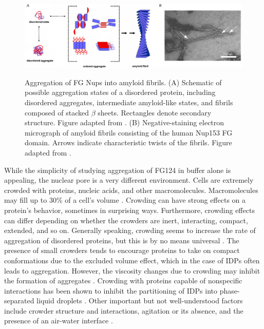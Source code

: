 \begin{figure}[t!]
\caption[Aggregation of FG Nups into amyloid fibrils.]{Aggregation of FG Nups into amyloid fibrils. (A) Schematic of possible aggregation states of a disordered protein, including disordered aggregates, intermediate amyloid-like states, and fibrils composed of stacked $\beta$ sheets. Rectangles denote secondary structure.  Figure adapted from \cite{jahn08}. (B) Negative-staining electron micrograph of amyloid fibrils consisting of the human Nup153 FG domain.  Arrows indicate characteristic twists of the fibrils.  Figure adapted from \cite{milles13}.}
\centering
\includegraphics[width=\textwidth]{figs/ch05/amyloid-intro}
\label{fig:amyloid}
\end{figure}

While the simplicity of studying aggregation of FG124 in buffer alone is appealing, the nuclear pore is a very different environment.  Cells are extremely crowded with proteins, nucleic acids, and other macromolecules.  Macromolecules may fill up to 30\% of a cell's volume \cite{breydo14}.  Crowding can have strong effects on a protein's behavior, sometimes in surprising ways.  Furthermore, crowding effects can differ depending on whether the crowders are inert, interacting, compact, extended, and so on.  Generally speaking, crowding seems to increase the rate of aggregation of disordered proteins, but this is by no means universal \cite{breydo15, breydo14,lee12,magno10,milles13}.  The presence of small crowders tends to encourage proteins to take on compact conformations due to the excluded volume effect, which in the case of IDPs often leads to aggregation.  However, the viscosity changes due to crowding may inhibit the formation of aggregates \cite{sleutel12,saha16}.  Crowding with proteins capable of nonspecific interactions has been shown to inhibit the partitioning of IDPs into phase-separated liquid droplets \cite{protter18}.  Other important but not well-understood factors include crowder structure and interactions, agitation or its absence, and the presence of an air-water interface \cite{lee12, breydo14}.

